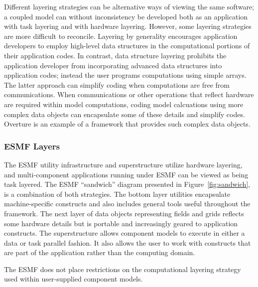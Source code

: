 Different layering strategies can be alternative ways of viewing the same
software; a coupled model can without inconsistency 
be developed both as an application with task layering and with hardware 
layering.  However, some layering strategies are more difficult to reconcile. 
Layering by generality encourages application developers to employ high-level 
data structures in the computational portions of their application codes.  In 
contrast, data structure layering prohibits the application developer from 
incorporating advanced data structures into application codes; instead the
user programs computations using simple arrays.  The latter approach can 
simplify coding
when computations are free from communications.  When communications or other
operations that reflect hardware are required within model computations, coding
model calcuations using more complex data objects can encapsulate some of 
these details and simplify codes.  Overture \cite{overture} is an example of a framework 
that provides such complex data objects. 

\subsubsection{ESMF Layers}

The ESMF utility infrastructure and superstructure utilize hardware layering, 
and multi-component applications running under ESMF can be viewed as 
being task layered.  The ESMF ``sandwich'' diagram presented in Figure~\ref{fig:sandwich}, is a combination 
of both strategies.  The bottom layer utilities encapsulate 
machine-specific constructs and also includes general tools useful throughout
the framework.  The next layer of data objects representing
fields and grids reflects some hardware details but is portable and increasingly
geared to application constructs.  The 
superstructure allows component models to execute in either a data or task 
parallel fashion.  It also allows the user to work with constructs that are part
of the application rather than the computing domain.  

The ESMF does not place restrictions on the computational layering 
strategy used within user-supplied component models.  









